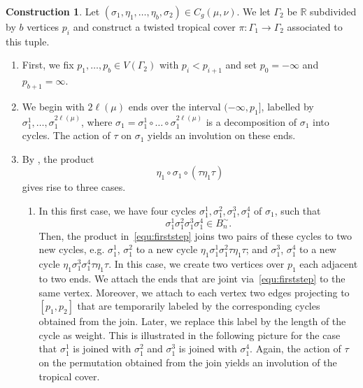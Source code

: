 \documentclass[11pt]{article}
\theoremstyle{definition}
\numberwithin{equation}{section}
\newtheorem{construction}[theo]{Construction}
\begin{document}
\begin{construction}
\label{con-twist}
Let $(\sigma_1,
\eta_1,\dots,\eta_b,\sigma_2)\in C_g(\mu,\nu)$. We let $\Gamma_2$ be $\mathbb{R}$ subdivided by $b$ vertices $p_i$ and construct a twisted tropical cover $\pi\colon\Gamma_1\to\Gamma_2$ associated to this tuple.

\begin{enumerate}
    \item First, we fix $p_1,\dots,p_b\in V(\Gamma_2)$ with $p_i<p_{i+1}$ and set $p_0=-\infty$ and $p_{b+1}=
    \infty$.
    \item We begin with $2\ell(\mu)$ ends over the interval $(-\infty,p_1]$, labelled by $\sigma_1^1,\dots,\sigma_1^{2\ell(\mu)}$, where $\sigma_1=\sigma_1^1\circ \ldots \circ \sigma_1^{2\ell(\mu)}$ is a decomposition of $\sigma_1$ into cycles. The action of $\tau$ on $\sigma_1$ yields an involution on these ends.
    \item By \cite[Theorem 2.14]{BF21}, the product
    \begin{equation}
    \label{equ:firststep}
        \eta_1\circ\sigma_1\circ(\tau\eta_1\tau) \tag{*}
    \end{equation}
    gives rise to three cases.
    \begin{enumerate}
        \item In this first case, we have four cycles $\sigma_1^1,\sigma_1^2,\sigma_1^3,\sigma_1^4$ of $\sigma_1$, such that
        \begin{equation*}
            \sigma_1^1\sigma_1^2\sigma_1^3\sigma_1^4\in B^{\sim}_n.
        \end{equation*}
        Then, the product in~\eqref{equ:firststep} joins two pairs of these cycles to two new cycles, e.g. $\sigma_1^1$, $\sigma_1^2$ to a new cycle $\eta_1\sigma_1^1\sigma_1^2\tau\eta_1\tau$; and $\sigma_1^3$, $\sigma_1^4$ to a new cycle $\eta_1\sigma_1^3\sigma_1^4\tau\eta_1\tau$.
        In this case, we create two vertices over $p_1$ each adjacent to two ends. We attach the ends that are joint via~\eqref{equ:firststep} to the same vertex. Moreover, we attach to each vertex two edges projecting to $[p_1,p_2]$ that are temporarily labeled by the corresponding cycles obtained from the join. Later, we replace this label by the length of the cycle as weight. This is illustrated in the following picture for the case that $\sigma_1^1$ is joined with $\sigma_1^2$ and $\sigma_1^3$ is joined with $\sigma_1^4$. Again, the action of $\tau$ on the permutation obtained from the join yields an involution of the tropical cover. 
        

\end{enumerate}
\end{enumerate}
\end{construction}
\end{document}
